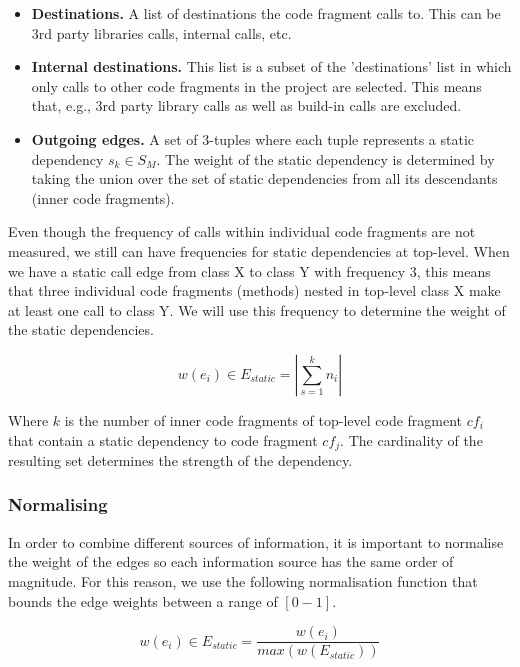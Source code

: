 \begin{itemize}
    \item \textbf{Destinations.} A list of destinations the code fragment calls to. This can be 3rd party libraries calls, internal calls, etc.
    \item \textbf{Internal destinations.} This list is a subset of the 'destinations' list in which only calls to other code fragments in the project are selected. This means that, e.g., 3rd party library calls as well as build-in calls are excluded.
    \item \textbf{Outgoing edges.} A set of 3-tuples where each tuple represents a static dependency $s_k \in S_M$. The weight of the static dependency is determined by taking the union over the set of static dependencies from all its descendants (inner code fragments). 
\end{itemize}

Even though the frequency of calls within individual code fragments are not measured, we still can have frequencies for static dependencies at top-level. When we have a static call edge from class X to class Y with frequency 3, this means that three individual code fragments (methods) nested in top-level class X make at least one call to class Y. We will use this frequency to determine the weight of the static dependencies.

\begin{equation}
    w(e_{i}) \in E_{static} = | \sum_{s=1}^{k}n_i |
\end{equation}

Where $k$ is the number of inner code fragments of top-level code fragment $cf_i$ that contain a static dependency to code fragment $cf_j$. The cardinality of the resulting set determines the strength of the dependency.

\subsubsection{Normalising}
In order to combine different sources of information, it is important to normalise the weight of the edges so each information source has the same order of magnitude. For this reason, we use the following normalisation function that bounds the edge weights between a range of $[0-1]$.

\begin{equation}\label{eq:normalising_edges}
    w(e_{i}) \in E_{static} = \frac{w(e_{i})}{max(w(E_{static}))}
\end{equation}

